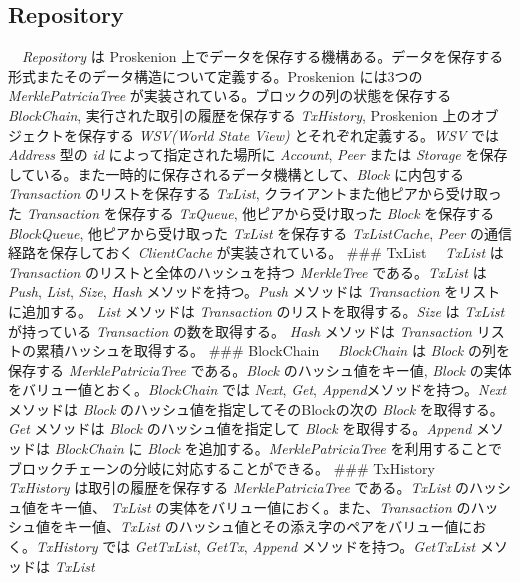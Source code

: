 \hypertarget{repository}{%
\subsection{Repository}\label{repository}}

　\emph{Repository} は Proskenion
上でデータを保存する機構ある。データを保存する形式またそのデータ構造について定義する。Proskenion
には3つの \emph{MerklePatriciaTree}
が実装されている。ブロックの列の状態を保存する \emph{BlockChain},
実行された取引の履歴を保存する \emph{TxHistory}, Proskenion
上のオブジェクトを保存する \emph{WSV(World State View)}
とそれぞれ定義する。\emph{WSV} では \emph{Address} 型の \emph{id}
によって指定された場所に \emph{Account}, \emph{Peer} または
\emph{Storage}
を保存している。また一時的に保存されるデータ機構として、\emph{Block}
に内包する \emph{Transaction} のリストを保存する \emph{TxList},
クライアントまた他ピアから受け取った \emph{Transaction} を保存する
\emph{TxQueue}, 他ピアから受け取った \emph{Block} を保存する
\emph{BlockQueue}, 他ピアから受け取った \emph{TxList} を保存する
\emph{TxListCache}, \emph{Peer} の通信経路を保存しておく
\emph{ClientCache} が実装されている。 \#\#\# TxList 　\emph{TxList} は
\emph{Transaction} のリストと全体のハッシュを持つ \emph{MerkleTree}
である。\emph{TxList} は \emph{Push}, \emph{List}, \emph{Size},
\emph{Hash} メソッドを持つ。\emph{Push} メソッドは \emph{Transaction}
をリストに追加する。 \emph{List} メソッドは \emph{Transaction}
のリストを取得する。\emph{Size} は \emph{TxList} が持っている
\emph{Transaction} の数を取得する。 \emph{Hash} メソッドは
\emph{Transaction} リストの累積ハッシュを取得する。 \#\#\# BlockChain
　\emph{BlockChain} は \emph{Block} の列を保存する
\emph{MerklePatriciaTree} である。\emph{Block} のハッシュ値をキー値,
\emph{Block} の実体をバリュー値とおく。\emph{BlockChain} では
\emph{Next}, \emph{Get}, \emph{Append}メソッドを持つ。\emph{Next}
メソッドは \emph{Block} のハッシュ値を指定してそのBlockの次の
\emph{Block} を取得する。\emph{Get} メソッドは \emph{Block}
のハッシュ値を指定して \emph{Block} を取得する。\emph{Append} メソッドは
\emph{BlockChain} に \emph{Block} を追加する。\emph{MerklePatriciaTree}
を利用することでブロックチェーンの分岐に対応することができる。 \#\#\#
TxHistory 　\emph{TxHistory} は取引の履歴を保存する
\emph{MerklePatriciaTree} である。\emph{TxList} のハッシュ値をキー値、
\emph{TxList} の実体をバリュー値におく。また、\emph{Transaction}
のハッシュ値をキー値、\emph{TxList}
のハッシュ値とその添え字のペアをバリュー値におく。\emph{TxHistory} では
\emph{GetTxList}, \emph{GetTx}, \emph{Append}
メソッドを持つ。\emph{GetTxList} メソッドは \emph{TxList}
